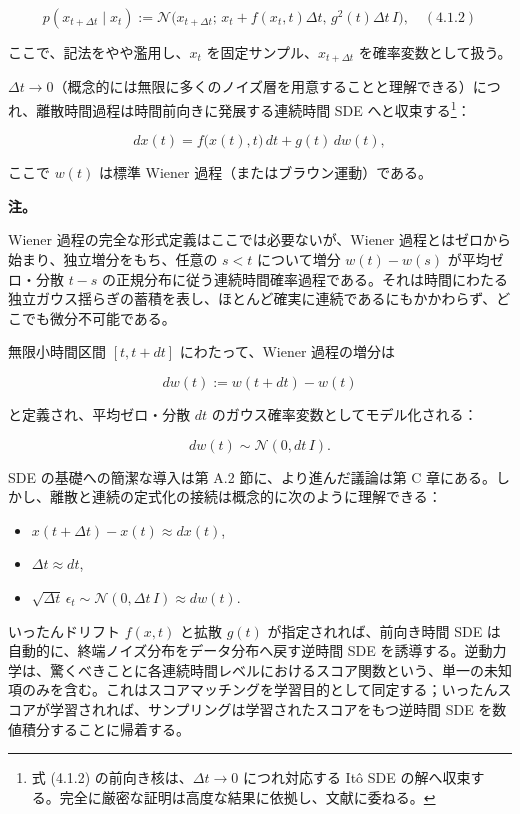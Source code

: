 \[
p(x_{t+\Delta t}\mid x_t) := \mathcal{N}\bigl(x_{t+\Delta t};\, x_t+f(x_t,t)\Delta t,\, g^2(t)\Delta t\, I\bigr), \quad (4.1.2)
\]


ここで、記法をやや濫用し、$x_t$ を固定サンプル、$x_{t+\Delta t}$ を確率変数として扱う。

$\Delta t\to 0$（概念的には無限に多くのノイズ層を用意することと理解できる）につれ、離散時間過程は時間前向きに発展する連続時間 SDE へと収束する\footnote{式 (4.1.2) の前向き核は、$\Delta t\to 0$ につれ対応する Itô SDE の解へ収束する。完全に厳密な証明は高度な結果に依拠し、文献に委ねる。}：

\[
dx(t) = f\bigl(x(t),t\bigr)\, dt + g(t)\, dw(t),
\]


ここで $w(t)$ は標準 Wiener 過程（またはブラウン運動）である。

\textbf{注。}

Wiener 過程の完全な形式定義はここでは必要ないが、Wiener 過程とはゼロから始まり、独立増分をもち、任意の $s<t$ について増分 $w(t)-w(s)$ が平均ゼロ・分散 $t-s$ の正規分布に従う連続時間確率過程である。それは時間にわたる独立ガウス揺らぎの蓄積を表し、ほとんど確実に連続であるにもかかわらず、どこでも微分不可能である。

無限小時間区間 $[t,t+dt]$ にわたって、Wiener 過程の増分は

\[
dw(t) := w(t+dt)-w(t)
\]


と定義され、平均ゼロ・分散 $dt$ のガウス確率変数としてモデル化される：

\[
dw(t)\sim\mathcal{N}(0,dt\, I).
\]


SDE の基礎への簡潔な導入は第 A.2 節に、より進んだ議論は第 C 章にある。しかし、離散と連続の定式化の接続は概念的に次のように理解できる：

\begin{itemize}
\item $x(t+\Delta t)-x(t)\approx dx(t)$,
\item $\Delta t\approx dt$,
\item $\sqrt{\Delta t}\,\epsilon_t\sim\mathcal{N}(0,\Delta t\, I)\approx dw(t)$.
\end{itemize}


いったんドリフト $f(x,t)$ と拡散 $g(t)$ が指定されれば、前向き時間 SDE は自動的に、終端ノイズ分布をデータ分布へ戻す逆時間 SDE を誘導する。逆動力学は、驚くべきことに各連続時間レベルにおけるスコア関数という、単一の未知項のみを含む。これはスコアマッチングを学習目的として同定する；いったんスコアが学習されれば、サンプリングは学習されたスコアをもつ逆時間 SDE を数値積分することに帰着する。

